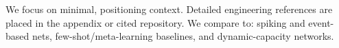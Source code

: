 We focus on minimal, positioning context. Detailed engineering references are placed in the appendix or cited repository. We compare to: spiking and event-based nets, few-shot/meta-learning baselines, and dynamic-capacity networks.